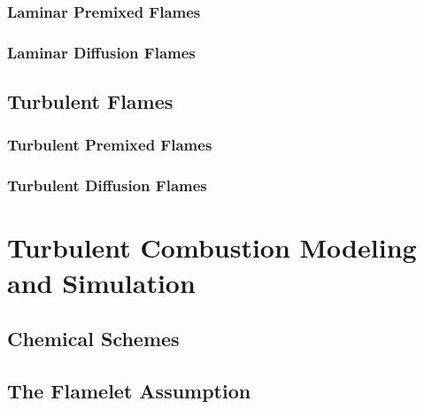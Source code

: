 %
\subsubsection{Laminar Premixed Flames} %
\label{ssub:laminar_premixed_flames}
%

%
%
\subsubsection{Laminar Diffusion Flames} %
\label{ssub:laminar_diffusion_flames}
%

%
%
%
\subsection{Turbulent Flames} %
\label{sub:turbulent_flames}
%
\subsubsection{Turbulent Premixed Flames} %
\label{ssub:turbulent_premixed_flames}
%

%
%
\subsubsection{Turbulent Diffusion Flames} %
\label{ssub:turbulent_diffusion_flames}
%

%
%
%
%
\section{Turbulent Combustion Modeling and Simulation} %
\label{sec:simulation_of_turbulent_combustion}
%
\subsection{Chemical Schemes} %
\label{sub:chemical_schemes}
%

%
%
\subsection{The Flamelet Assumption} %
\label{sub:the_flamelet_assumption}
%

%
%
